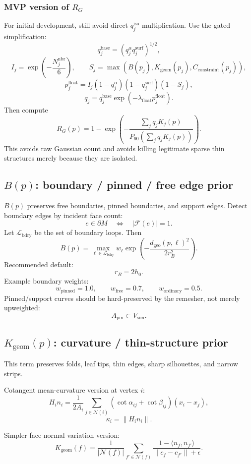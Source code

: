 \documentclass[11pt,a4paper]{article}
\begin{document}
\subsubsection{MVP version of $R_G$}

For initial development, still avoid direct $q_j^{\mathrm{iso}}$ multiplication. Use the gated simplification:
\[
q_j^{\mathrm{base}}=\left(q_j^\alpha q_j^{\mathrm{surf}}\right)^{1/2},
\]
\[
I_j=\exp\left(-\frac{N_j^{\mathrm{nbr}}}{6}\right),
\qquad
S_j=\max(B(p_j),K_{\mathrm{geom}}(p_j),C_{\mathrm{constraint}}(p_j)),
\]
\[
p_j^{\mathrm{float}}=I_j(1-q_j^\alpha)(1-q_j^{\mathrm{surf}})(1-S_j),
\]
\[
q_j=q_j^{\mathrm{base}}\exp(-\lambda_{\mathrm{float}}p_j^{\mathrm{float}}).
\]
Then compute
\[
R_G(p)=1-\exp\left(-\frac{\sum_j q_jK_j(p)}{P_{90}(\sum_j q_jK_j(p))}\right).
\]
This avoids raw Gaussian count and avoids killing legitimate sparse thin structures merely because they are isolated.

\subsection{$B(p)$: boundary / pinned / free edge prior}

$B(p)$ preserves free boundaries, pinned boundaries, and support edges. Detect boundary edges by incident face count:
\[
e\in\partial M \quad\Longleftrightarrow\quad |\mathcal{F}(e)|=1.
\]
Let $\mathcal{L}_{\mathrm{bdry}}$ be the set of boundary loops. Then
\[
B(p)=\max_{\ell\in\mathcal{L}_{\mathrm{bdry}}}
 w_\ell \exp\left(-\frac{d_{\mathrm{geo}}(p,\ell)^2}{2r_B^2}\right).
\]
Recommended default:
\[
r_B=2h_0.
\]
Example boundary weights:
\[
w_{\mathrm{pinned}}=1.0,
\qquad
w_{\mathrm{free}}=0.7,
\qquad
w_{\mathrm{ordinary}}=0.5.
\]
Pinned/support curves should be hard-preserved by the remesher, not merely upweighted:
\[
A_{\mathrm{pin}}\subset V_{\mathrm{sim}}.
\]

\subsection{$K_{\mathrm{geom}}(p)$: curvature / thin-structure prior}

This term preserves folds, leaf tips, thin edges, sharp silhouettes, and narrow strips.

Cotangent mean-curvature version at vertex $i$:
\[
H_i n_i=\frac{1}{2A_i}\sum_{j\in\mathcal{N}(i)}
(\cot\alpha_{ij}+\cot\beta_{ij})(x_i-x_j),
\]
\[
\kappa_i=\|H_i n_i\|.
\]

Simpler face-normal variation version:
\[
K_{\mathrm{geom}}(f)=
\frac{1}{|\mathcal{N}(f)|}
\sum_{f'\in\mathcal{N}(f)}
\frac{1-\langle n_f,n_{f'}\rangle}{\|c_f-c_{f'}\|+\epsilon}.
\]
\end{document}
